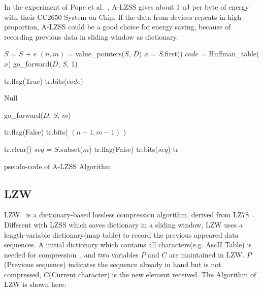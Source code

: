In the experiment of Pope et al.~\cite{pope2018accelerometer}, A-LZSS gives
about 1 uJ per byte of energy with their CC2650 System-on-Chip. If the data from
devices repeats in high proportion, A-LZSS could be a good choice for energy
saving, because of recording previous data in sliding window as dictionary.
\begin{algorithm}
\begin{algorithmic}[1]
\Input
\EndInput
\Output
\EndOutput

\State $S$ = $S$ + $e$  
\State $(n, m)$ = value\_pointers($S$, $D$)  
    \State $x$ = $S$.first()    
    \State $code$ = Huffman\_table($x$)
    \State go\_forward($D$, $S$, 1) 
    
    \State tr.flag(True)    
    \State tr.bits($code$)  
    
   
    \State \Return Null
    
\Else                       {}
    \State go\_forward($D$, $S$, $m$) 
    
    \State tr.flag(False)
    \State tr.bits( $(n-1, m-1)$ )  
\EndIf

 
    \State tr.clear()
    \State $seq$ = $S$.subset($m$) 
    \State tr.flag(False)
    \State tr.bits($seq$)   
\EndIf
\State \Return tr

\end{algorithmic}
\caption{pseudo-code of A-LZSS Algorithm}
\label{algo:A-LZSS}
\end{algorithm}

\subsection{LZW}
LZW~\cite{welch1984technique} is a dictionary-based lossless compression
algorithm, derived from LZ78~\cite{ziv1978compression}. Different with LZSS
which saves dictionary in a sliding window, LZW uses a length-variable
dictionary(map table) to record the previous appeared data sequences. A initial
dictionary which contains all characters(e.g. AscII Table) is needed for
compression~\cite{welch1984technique}, and two variables $P$ and $C$ are
maintained in LZW. $P$(Previous sequence) indicates the sequence already in hand
but is not compressed, $C$(Current character) is the new element received. The
Algorithm of LZW is shown here:

